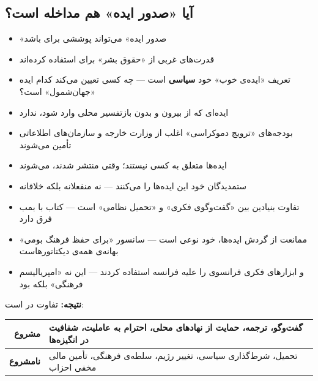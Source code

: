 \subsection{آیا «صدور ایده» هم مداخله است؟}

\begin{tcolorbox}[enemybox, title={نقد}]
\begin{itemize}
\item «صدور ایده» می‌تواند پوششی برای  باشد
\item قدرت‌های غربی از «حقوق بشر» برای  استفاده
  کرده‌اند
\item تعریف «ایده‌ی خوب» خود \textbf{سیاسی} است — چه کسی تعیین می‌کند
  کدام ایده «جهان‌شمول» است؟
\item ایده‌ای که از بیرون و بدون بازتفسیر محلی وارد شود،  ندارد
\item بودجه‌های «ترویج دموکراسی» اغلب از وزارت خارجه و سازمان‌های
  اطلاعاتی تأمین می‌شوند
\end{itemize}
\end{tcolorbox}

\begin{tcolorbox}[successbox, title={دفاع}]
\begin{itemize}
\item ایده‌ها متعلق به کسی نیستند؛ وقتی منتشر شدند، 
  می‌شوند
\item ستمدیدگان خود این ایده‌ها را  می‌کنند
  — نه منفعلانه بلکه خلاقانه
\item تفاوت بنیادین بین «گفت‌وگوی فکری» و «تحمیل نظامی» است — کتاب با
  بمب فرق دارد
\item ممانعت از گردش ایده‌ها، خود نوعی  است — سانسور
  «برای حفظ فرهنگ بومی» بهانه‌ی همه‌ی دیکتاتورهاست
\item {} و  ابزارهای فکری فرانسوی را
  علیه فرانسه استفاده کردند — این نه «امپریالیسم فرهنگی» بلکه
   بود
\end{itemize}
\end{tcolorbox}

\textbf{نتیجه:} تفاوت در  است:

\begin{table}[H]
\centering
\begin{tabularx}{\textwidth}{r|X}
\toprule
\textbf{مشروع} & گفت‌وگو، ترجمه، حمایت از نهادهای محلی، احترام به
  عاملیت، شفافیت در انگیزه‌ها \\
\midrule
\textbf{نامشروع} & تحمیل، شرط‌گذاری سیاسی، تغییر رژیم، سلطه‌ی فرهنگی،
  تأمین مالی مخفی احزاب \\
\bottomrule
\end{tabularx}
\end{table}


